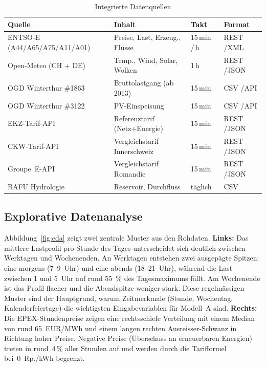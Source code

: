 \documentclass[sigconf]{acmart}
\begin{document}
\begin{table}[t]
  \caption{Integrierte Datenquellen}
  \label{tab:datasources}
  \footnotesize
  \setlength{\tabcolsep}{2.4pt}
  \begin{tabular}{@{}p{2.75cm}p{2.15cm}p{0.95cm}p{1.15cm}@{}}
    \toprule
    Quelle & Inhalt & Takt & Format \\
    \midrule
    ENTSO-E (A44/A65/\newline A75/A11/A01)
      & Preise, Last, Erzeug., Fl\"usse & 15\,min /\newline 1\,h & REST /\newline XML \\[2pt]
    Open-Meteo (CH + DE)
      & Temp., Wind, Solar, Wolken & 1\,h & REST /\newline JSON \\[2pt]
    OGD Winterthur \#1863
      & Bruttolastgang (ab 2013) & 15\,min & CSV /\newline API \\[2pt]
    OGD Winterthur \#3122
      & PV-Einspeisung & 15\,min & CSV /\newline API \\[2pt]
    EKZ-Tarif-API
      & Referenztarif (Netz+Energie) & 15\,min & REST /\newline JSON \\[2pt]
    CKW-Tarif-API
      & Vergleichstarif Innerschweiz & 15\,min & REST /\newline JSON \\[2pt]
    Groupe~E-API
      & Vergleichstarif Romandie & 15\,min & REST /\newline JSON \\[2pt]
    BAFU Hydrologie
      & Reservoir, Durchfluss & t\"aglich & CSV \\
    \bottomrule
  \end{tabular}
\end{table}

\subsection{Explorative Datenanalyse}

Abbildung~\ref{fig:eda} zeigt zwei zentrale Muster aus den Rohdaten.
\textbf{Links:} Das mittlere Lastprofil pro Stunde des Tages unterscheidet
sich deutlich zwischen Werktagen und Wochenenden.
An Werktagen entstehen zwei ausgep\"agte Spitzen: eine morgens (7--9~Uhr)
und eine abends (18--21~Uhr), w\"ahrend die Last zwischen 1 und 5~Uhr
auf rund 55~\% des Tagesmaximums f\"allt.
Am Wochenende ist das Profil flacher und die Abendspitze weniger stark.
Diese regelm\"assigen Muster sind der Hauptgrund, warum Zeitmerkmale
(Stunde, Wochentag, Kalender\-feier\-tage) die wichtigsten Eingabevariablen
f\"ur Modell~A sind.
\textbf{Rechts:} Die EPEX-Stundenpreise zeigen eine rechtsschiefe Verteilung
mit einem Median von rund 65~EUR/MWh und einem langen
rechten Ausreisser-Schwanz in Richtung hoher Preise.
Negative Preise (\"Uberschuss an erneuerbaren Energien) treten in
rund~4\,\% aller Stunden auf und werden durch die Tarifformel bei~0~Rp./kWh
begrenzt.
\end{document}
